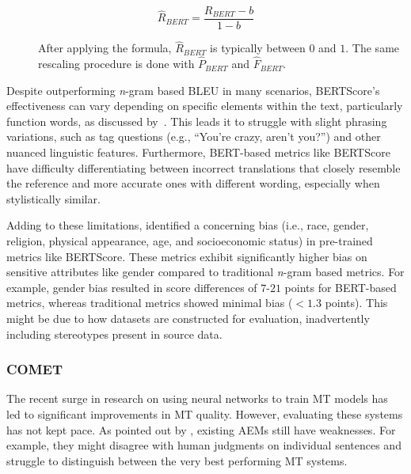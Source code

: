 {{    \begin{equation} \label{r-bert-baseline}
     \hat{R}_{BERT} = \frac{R_{BERT} - b}{1 − b}
    \end{equation}

\begin{description}    
    \item[\hspace{=2em}]After applying the formula, $\hat{R}_{BERT}$ is typically between $0$ and $1$. The same rescaling procedure is done with $\hat{P}_{BERT}$ and $\hat{F}_{BERT}$.
\end{description}    


Despite outperforming \emph{n}-gram based BLEU in many scenarios, BERTScore's effectiveness can vary depending on specific elements within the text, particularly function words, as discussed by~\textcite{hanna-bojar-2021-fine}. This leads it to struggle with slight phrasing variations, such as tag questions (e.g., ``You're crazy, aren't you?'') and other nuanced linguistic features. Furthermore, BERT-based metrics like BERTScore have difficulty differentiating between incorrect translations that closely resemble the reference and more accurate ones with different wording, especially when stylistically similar.

Adding to these limitations, \textcite{sun-etal-2022-bertscore} identified a concerning bias (i.e., race, gender, religion, physical appearance, age, and socioeconomic status) in pre-trained metrics like BERTScore. These metrics exhibit significantly higher bias on sensitive attributes like gender compared to traditional \emph{n}-gram based metrics. For example, gender bias resulted in score differences of $7$-$21$ points for BERT-based metrics, whereas traditional metrics showed minimal bias ($< 1.3$ points). This might be due to how datasets are constructed for evaluation, inadvertently including stereotypes present in source data.


\subsubsection{COMET}

The recent surge in research on using neural networks to train MT models has led to significant improvements in MT quality. However, evaluating these systems has not kept pace. As pointed out by \textcite{ma-etal-2019-results, rei-etal-2020-comet}, existing AEMs still have weaknesses. For example, they might disagree with human judgments on individual sentences and struggle to distinguish between the very best performing MT systems.

}}
